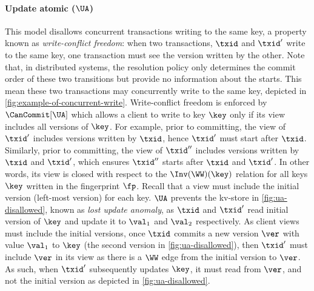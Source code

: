 \paragraph{Update atomic  (\(\UA\))}
This model disallows concurrent transactions writing to the same key,
a property known as \emph{write-conflict freedom}:  
when two transactions, \( \txid \) and \( \txid'\) write to the same key, one transaction must see the version 
written by the other.
Note that, in distributed systems, 
the resolution policy only determines the commit order of these two transitions 
but provide no information about the starts.
This mean these two transactions may concurrently write to the same key,
depicted in \cref{fig:example-of-concurrent-write}.
Write-conflict freedom is enforced by \(\CanCommit[\UA]\) 
which allows a client to write to key \(\key\) 
only if its view includes all versions of \(\key\).
For example, prior to committing, the view of \( \txid' \) includes versions written by \( \txid \),
hence \( \txid' \) must start after \( \txid \).
Similarly, prior to committing, the view of \( \txid'' \)  includes versions written by \( \txid \) and \( \txid' \), 
which ensures \( \txid'' \) starts after \( \txid \) and \( \txid' \).
In other words, its view is closed with respect to the \(\Inv(\WW)(\key)\) relation 
for all keys \(\key\) written in the fingerprint \(\fp\).
Recall that a view must include the initial version (left-most version) for each key.
\( \UA \) prevents the kv-store in \cref{fig:ua-disallowed}, known as \emph{lost update anomaly},
as \(\txid\) and \(\txid'\) read initial version of \(\key\)
and update it to \( \val_1 \) and \( \val_2 \) respectively.
As client views must include the initial versions, 
once \(\txid\) commits a new version \(\ver\) with value \(\val_1\) to \(\key\)
(the second version in \cref{fig:ua-disallowed}), 
then \(\txid'\) must include \(\ver\) in its view as 
there is a \(\WW\) edge from the initial version to \(\ver\). 
As such, when \(\txid'\) subsequently updates \(\key\), 
it must read from \(\ver\), and not the initial version as depicted in \cref{fig:ua-disallowed}.


